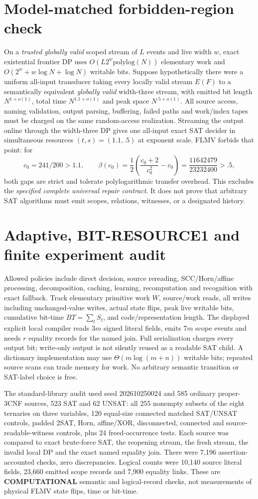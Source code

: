 \documentclass[11pt]{article}
\begin{document}
\section{Model-matched forbidden-region check}
On a \emph{trusted globally valid} scoped stream of $L$ events
and live width $w$, exact existential frontier DP uses
$O(L2^w\mathrm{polylog}(N))$ elementary work and
$O(2^w+w\log N+\log N)$ writable bits.
Suppose hypothetically there were a uniform all-input
transducer taking every locally valid stream $E(F)$ to a
semantically equivalent \emph{globally valid} width-three stream,
with emitted bit length $N^{1+o(1)}$, total time
$N^{1.1+o(1)}$ and peak space $N^{.5+o(1)}$.
All source access, naming validation, output parsing, buffering,
failed paths and work/index tapes must be charged on the same
random-access realization. Streaming the output online through
the width-three DP gives one all-input exact SAT decider in
simultaneous resources $(t,s)=(1.1,.5)$ at exponent scale.
FLMV forbids that point: for
\[
c_0=241/200>1.1,\qquad
\beta(c_0)=\frac12\left(\frac{c_0+2}{c_0^2}-c_0\right)
=\frac{11642479}{23232400}>.5,
\]
both gaps are strict and tolerate polylogarithmic transfer overhead.
This excludes the \emph{specified complete universal repair
contract}. It does not prove that arbitrary SAT algorithms must
emit scopes, relations, witnesses, or a designated history.

\section{Adaptive, BIT-RESOURCE1 and finite experiment audit}
Allowed policies include direct decision, source rereading,
SCC/Horn/affine processing, decomposition, caching,
learning, recomputation and recognition with exact fallback.
Track elementary primitive work $W$, source/work reads,
all writes including unchanged-value writes, actual state flips,
peak live writable bits, cumulative bit-time
$BT=\sum_t S_t$, and code/representation length.
The displayed explicit local compiler reads $3m$ signed literal
fields, emits $7m$ scope events and needs $r$ equality records
for the named join. Full serialization charges every output bit;
write-only output is not silently reused as a readable SAT child.
A dictionary implementation may use $\Theta(m\log(m+n))$ writable
bits; repeated source scans can trade memory for work.
No arbitrary semantic transition or SAT-label choice is free.

The standard-library audit used seed 202610250024 and
585 ordinary proper-3CNF sources, 523 SAT and 62 UNSAT:
all 255 nonempty subsets of the eight ternaries on three
variables, 120 equal-size connected matched SAT/UNSAT controls,
padded 2SAT, Horn, affine/XOR, disconnected, connected and
source-readable-witness controls, plus 24 freed-occurrence tests.
Each source was compared to exact brute-force SAT,
the reopening stream, the fresh stream, the invalid local
DP and the exact named equality join. There were
7,196 assertion-accounted checks, zero discrepancies.
Logical counts were 10,140 source literal fields, 23,660
emitted scope records and 7,900 equality links. These
are \textbf{COMPUTATIONAL} semantic and logical-record checks,
not measurements of physical FLMV state flips, time or bit-time.
\end{document}
